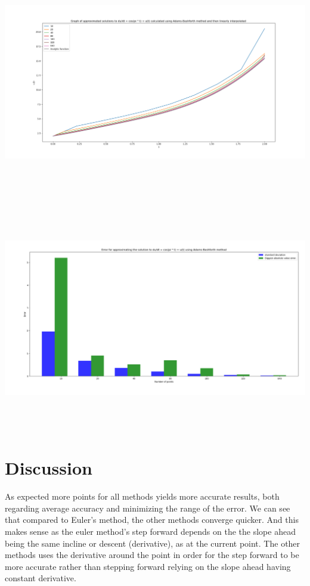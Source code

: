 \documentclass[10pt]{article}
\begin{document}
\begin{center}
\includegraphics[angle=0,height=10cm]{./img/adam_function.png}
\end{center}

\begin{center}
\includegraphics[angle=0,height=10cm]{./img/adam_error.png}
\end{center}

\section{Discussion}
\label{sec:orgba155ff}

As expected more points for all methods yields more accurate results, both
regarding average accuracy and minimizing the range of the error. We can see that
compared to Euler's method, the other methods converge quicker. And this makes sense
as the euler method's step forward depends on the the slope ahead being the same incline or
descent (derivative), as at the current point. The other methods uses the
derivative around the point in order for the step forward to be more accurate rather
than stepping forward relying on the slope ahead having constant derivative.
\end{document}
